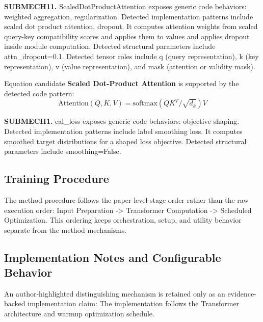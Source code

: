 \textbf{SUBMECH11.} ScaledDotProductAttention exposes generic code behaviors: weighted aggregation, regularization. Detected implementation patterns include scaled dot product attention, dropout. It computes attention weights from scaled query-key compatibility scores and applies them to values and applies dropout inside module computation. Detected structural parameters include attn\_dropout=0.1. Detected tensor roles include q (query representation), k (key representation), v (value representation), and mask (attention or validity mask).

Equation candidate \textbf{Scaled Dot-Product Attention} is supported by the detected code pattern:
\[
\mathrm{Attention}(Q,K,V)=\mathrm{softmax}(QK^T/\sqrt{d_k})V
\]

\textbf{SUBMECH1.} cal\_loss exposes generic code behaviors: objective shaping. Detected implementation patterns include label smoothing loss. It computes smoothed target distributions for a shaped loss objective. Detected structural parameters include smoothing=False.

\subsection{Training Procedure}
The method procedure follows the paper-level stage order rather than the raw execution order: Input Preparation -> Transformer Computation -> Scheduled Optimization. This ordering keeps orchestration, setup, and utility behavior separate from the method mechanisms.

\subsection{Implementation Notes and Configurable Behavior}
An author-highlighted distinguishing mechanism is retained only as an evidence-backed implementation claim: The implementation follows the Transformer architecture and warmup optimization schedule.
